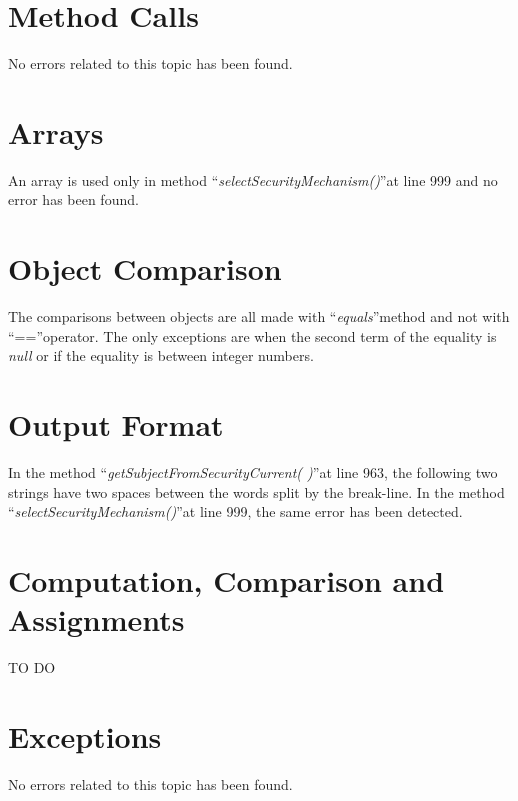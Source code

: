 \documentclass[\mainpath/main]{subfiles}
\begin{document}
\section{Method Calls}
\label{CodeInspectionChecklist:MethodCalls}
No errors related to this topic has been found.

\section{Arrays}
\label{CodeInspectionChecklist:Arrays}
An array is used only in method \textquotedblleft \textit{selectSecurityMechanism(\textellipsis)}\textquotedblright at line 999 and no error has been found.

\section{Object Comparison}
\label{CodeInspectionChecklist:ObjectComparison}
The comparisons between objects are all made with \textquotedblleft \textit{equals}\textquotedblright method and not with \textquotedblleft ==\textquotedblright operator. The only exceptions are when the second term of the equality is \textit{null} or if the equality is between integer numbers.

\section{Output Format}
\label{CodeInspectionChecklist:OutputFormat}
In the method \textquotedblleft \textit{getSubjectFromSecurityCurrent( )}\textquotedblright at line 963, the following two strings have two spaces between the words split by the break-line.
In the method \textquotedblleft \textit{selectSecurityMechanism(\textellipsis)}\textquotedblright at line 999, the same error has been detected.

\section{Computation, Comparison and Assignments}
\label{CodeInspectionChecklist:ComputationComparisonandAssignments}
TO DO

\section{Exceptions}
\label{CodeInspectionChecklist:Exceptions}
No errors related to this topic has been found.
\end{document}
